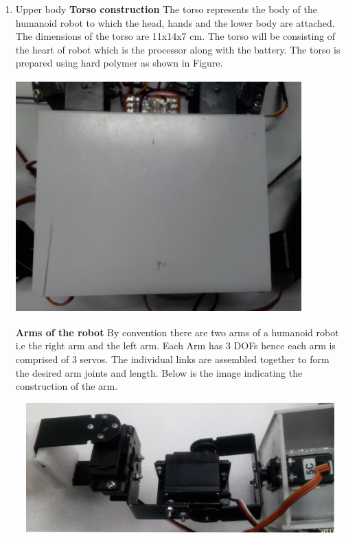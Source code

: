 \documentclass[12pt]{article}
\begin{document}
\begin{enumerate}
\item Upper body \newline
\textbf{Torso construction} \newline
The torso represents the body of the humanoid robot to which the head, hands and
the lower body are attached. The dimensions of the torso are 11x14x7 cm. The torso
will be consisting of the heart of robot which is the processor along with the battery.
The torso is prepared using hard polymer as shown in Figure. \newline
\begin{center}
	\includegraphics[width = 11cm,height= 9cm, angle =180]{torso.jpg}
\end{center}
\newpage
\textbf{Arms of the robot} \newline
By convention there are two arms of a humanoid robot i.e the right arm and the left
arm. Each Arm has 3 DOFs hence each arm is comprised of 3 servos. The
individual links are assembled together to form the desired arm joints and length.
Below is the image indicating the construction of the arm. \newline
\begin{center}
	\includegraphics[width = 13cm,height= 5cm]{hand.jpg}
\end{center}


\end{enumerate}
\end{document}
